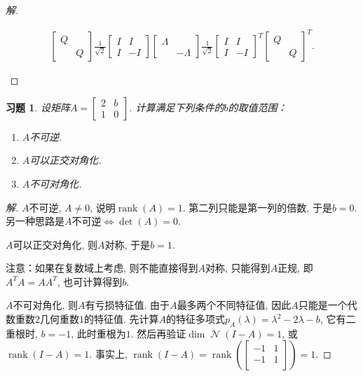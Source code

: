 \documentclass{ctexart}
\newtheorem{exercise}[thm]{习题}
\newcommand\note[1]{\par {\footnotesize\kaishu 注意：#1}}
\DeclareMathOperator{\rank}{rank}
\DeclareMathOperator{\nullspace}{\mathcal{N}}
\begin{document}
\begin{proof}[解]
\begin{enumerate}
\begin{align*}
\begin{bmatrix}
			 Q & \\ & Q
		\end{bmatrix}\frac{1}{\sqrt{2}}\begin{bmatrix}
		I & I \\ I & -I
		\end{bmatrix}\begin{bmatrix}
		 \Lambda & \\ & -\Lambda  
		\end{bmatrix}\frac{1}{\sqrt{2}}\begin{bmatrix}
		I & I \\ I & -I
		\end{bmatrix}^T\begin{bmatrix}
			 Q & \\ & Q
		\end{bmatrix}^T.
        \end{align*}
	\end{enumerate}
\end{proof}

\begin{exercise}
设矩阵$A=\begin{bmatrix}2&b\\1&0\end{bmatrix}$. 
计算满足下列条件的$b$的取值范围：
\begin{enumerate}
\item $A$不可逆. 
\item $A$可以正交对角化. 
\item $A$不可对角化. 
\end{enumerate}
\end{exercise}
\begin{proof}[解]
	$A$不可逆, $A\ne0$, 说明$\rank(A)=1$. 第二列只能是第一列的倍数, 于是$b=0$. 
	另一种思路是$A$不可逆$\Leftrightarrow \det(A)=0$. 

	$A$可以正交对角化, 则$A$对称, 于是$b=1$. \note{如果在复数域上考虑, 则不能直接得到$A$对称, 只能得到$A$正规, 即$A^TA=AA^T$, 也可计算得到$b$. }

	$A$不可对角化, 则$A$有亏损特征值. 由于$A$最多两个不同特征值, 因此$A$只能是一个代数重数$2$几何重数$1$的特征值. 先计算$A$的特征多项式$p_A(\lambda)=\lambda^2-2\lambda-b$, 它有二重根时, $b=-1$, 此时重根为$1$. 然后再验证$\dim\nullspace(I-A)=1$, 或$\rank(I-A)=1$. 事实上, $\rank(I-A)=\rank\left(\begin{bmatrix}
		-1 & 1\\
		-1 & 1\\
	\end{bmatrix}\right)=1$. 
\end{proof}
\end{document}
